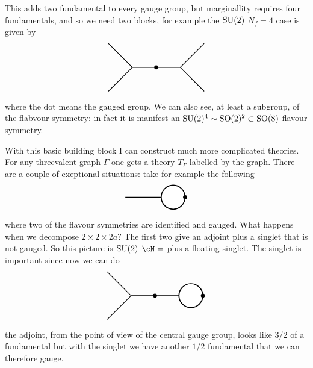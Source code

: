 This adds two fundamental to every gauge group, but marginallity requires four fundamentals, and so we need two blocks, for example the $\mathrm{SU}(2)$ $N_{f}=4$ case is given by
\begin{equation}
\begin{tikzpicture}[thick]
  \draw[-](0,0)--(1,-1);
  \draw[-](1,-1)--(0,-2);
  \draw[-](1,-1)--(2,-1);
  \draw[-](2,-1)--(3,-1);
  \draw[-](3,-1)--(4,0);
  \draw[-](3,-1)--(4,-2);
  \filldraw[black] (2,-1) circle (2pt) node[]{};
\end{tikzpicture}
\end{equation}
where the dot means the gauged group. We can also see, at least a subgroup, of the flabvour symmetry: in fact it is manifest an $\mathrm{SU}(2)^{4}\sim \mathrm{SO}(2)^{2}\subset \mathrm{SO}(8)$ flavour symmetry.

With this basic building block I can construct much more complicated theories. For any threevalent graph $\Gamma$ one gets a theory $T_{\Gamma}$ labelled by the graph. There are a couple of exeptional situations: take for example the following
\begin{equation}
\begin{tikzpicture}[thick]
	\draw[-](0,0)--(1.5,0);
	\filldraw[color=black, fill=white, very thick](2,0) circle (0.5);
 	\filldraw[black] (2.5,0) circle (2pt) node[]{};
\end{tikzpicture}
\label{eq:N4}
\end{equation}
where two of the flavour symmetries are identified and gauged. What happens when we decompose $2\times 2\times 2a$? The first two give an adjoint plus a singlet that is not gauged. So this picture is $\mathrm{SU}(2)$ $\cN=$ plus a floating singlet. The singlet is important since now we can do 
\begin{equation}
\begin{tikzpicture}[thick]
  \draw[-](0,0)--(1,-1);
  \draw[-](1,-1)--(0,-2);
  \draw[-](1,-1)--(2,-1);
  \draw[-](2,-1)--(3,-1);
  \filldraw[color=black, fill=white, very thick](3.5,-1) circle (0.5);
  \filldraw[black] (4,-1) circle (2pt) node[]{};
  \filldraw[black] (2,-1) circle (2pt) node[]{};
\end{tikzpicture}
\end{equation}
the adjoint, from the point of view of the central gauge group, looks like $3/2$ of a fundamental but with the singlet we have another $1/2$ fundamental that we can therefore gauge.

